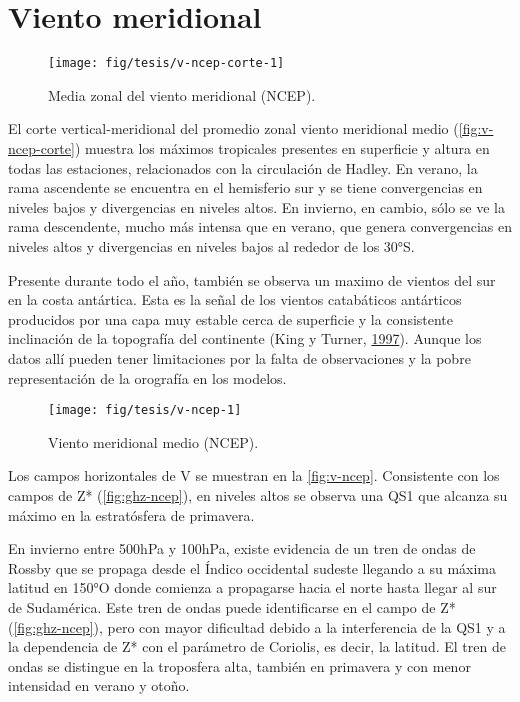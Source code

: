 \documentclass[spanish,a4paper,12pt]{book}
\begin{document}
\section{Viento meridional}\label{viento-meridional}

\begin{figure*}
\texttt{[image: fig/tesis/v-ncep-corte-1]} \caption{Media zonal del viento meridional (NCEP).}\label{fig:v-ncep-corte}
\end{figure*}

El corte vertical-meridional del promedio zonal viento meridional medio
(\autoref{fig:v-ncep-corte}) muestra los máximos tropicales presentes en
superficie y altura en todas las estaciones, relacionados con la
circulación de Hadley. En verano, la rama ascendente se encuentra en el
hemisferio sur y se tiene convergencias en niveles bajos y divergencias
en niveles altos. En invierno, en cambio, sólo se ve la rama
descendente, mucho más intensa que en verano, que genera convergencias
en niveles altos y divergencias en niveles bajos al rededor de los 30°S.

Presente durante todo el año, también se observa un maximo de vientos
del sur en la costa antártica. Esta es la señal de los vientos
catabáticos antárticos producidos por una capa muy estable cerca de
superficie y la consistente inclinación de la topografía del continente
(King y Turner, \protect\hyperlink{ref-King1997}{1997}). Aunque los
datos allí pueden tener limitaciones por la falta de observaciones y la
pobre representación de la orografía en los modelos.

\begin{landscape}\begin{figure}

{\centering \texttt{[image: fig/tesis/v-ncep-1]} 

}

\caption{Viento meridional medio (NCEP).}\label{fig:v-ncep}
\end{figure}
\end{landscape}

Los campos horizontales de V se muestran en la \autoref{fig:v-ncep}.
Consistente con los campos de Z* (\autoref{fig:ghz-ncep}), en niveles
altos se observa una QS1 que alcanza su máximo en la estratósfera de
primavera.

En invierno entre 500hPa y 100hPa, existe evidencia de un tren de ondas
de Rossby que se propaga desde el Índico occidental sudeste llegando a
su máxima latitud en 150°O donde comienza a propagarse hacia el norte
hasta llegar al sur de Sudamérica. Este tren de ondas puede
identificarse en el campo de Z* (\autoref{fig:ghz-ncep}), pero con mayor
dificultad debido a la interferencia de la QS1 y a la dependencia de Z*
con el parámetro de Coriolis, es decir, la latitud. El tren de ondas se
distingue en la troposfera alta, también en primavera y con menor
intensidad en verano y otoño.
\end{document}
